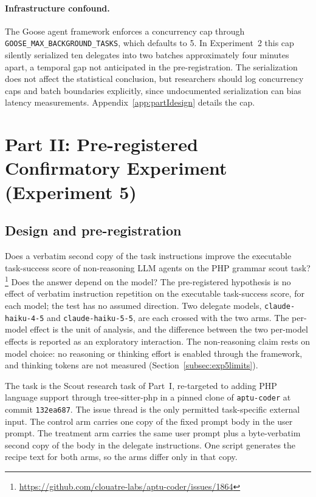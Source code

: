 \documentclass[11pt,a4paper]{article}
\begin{document}
\paragraph{Infrastructure confound.}
\label{subsec:infrastructure}
The Goose agent framework enforces a concurrency cap through \texttt{GOOSE\_MAX\_BACKGROUND\_TASKS}, which defaults to 5.
In Experiment~2 this cap silently serialized ten delegates into two batches approximately four minutes apart, a temporal gap not anticipated in the pre-registration.
The serialization does not affect the statistical conclusion, but researchers should log concurrency caps and batch boundaries explicitly, since undocumented serialization can bias latency measurements.
Appendix~\ref{app:partIdesign} details the cap.

\section{Part II: Pre-registered Confirmatory Experiment (Experiment 5)}
\label{sec:partII}

\subsection{Design and pre-registration}
\label{subsec:exp5design}

Does a verbatim second copy of the task instructions improve the executable task-success score of non-reasoning LLM agents on the PHP grammar scout task?\footnote{\url{https://github.com/clouatre-labs/aptu-coder/issues/1864}} Does the answer depend on the model?
The pre-registered hypothesis is no effect of verbatim instruction repetition on the executable task-success score, for each model; the test has no assumed direction.
Two delegate models, \texttt{claude-haiku-4-5} and \texttt{claude-haiku-5-5}, are each crossed with the two arms.
The per-model effect is the unit of analysis, and the difference between the two per-model effects is reported as an exploratory interaction.
The non-reasoning claim rests on model choice: no reasoning or thinking effort is enabled through the framework, and thinking tokens are not measured (Section~\ref{subsec:exp5limits}).

The task is the Scout research task of Part~I, re-targeted to adding PHP language support through tree-sitter-php in a pinned clone of \texttt{aptu-coder} at commit \texttt{132ea687}. The issue thread is the only permitted task-specific external input.
The control arm carries one copy of the fixed prompt body in the user prompt.
The treatment arm carries the same user prompt plus a byte-verbatim second copy of the body in the delegate instructions.
One script generates the recipe text for both arms, so the arms differ only in that copy.
\end{document}
